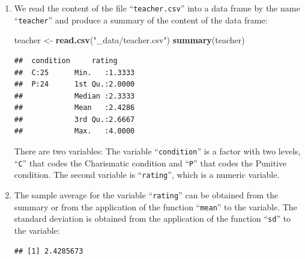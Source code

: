 \documentclass[]{krantz}
\makeatletter
\newenvironment{Shaded}{\begin{snugshade}}{\end{snugshade}}
\newcommand{\KeywordTok}[1]{\textcolor[rgb]{0.13,0.29,0.53}{\textbf{#1}}}
\newcommand{\StringTok}[1]{\textcolor[rgb]{0.31,0.60,0.02}{#1}}
\newcommand{\OperatorTok}[1]{\textcolor[rgb]{0.81,0.36,0.00}{\textbf{#1}}}
\newcommand{\NormalTok}[1]{#1}
\newenvironment{kframe}{%
\medskip{}
\setlength{\fboxsep}{.8em}
 \def\at@end@of@kframe{}%
 \ifinner\ifhmode%
  \def\at@end@of@kframe{\end{minipage}}%
  \begin{minipage}{\columnwidth}%
 \fi\fi%
 \def\FrameCommand##1{\hskip\@totalleftmargin \hskip-\fboxsep
 \colorbox{shadecolor}{##1}\hskip-\fboxsep
     \hskip-\linewidth \hskip-\@totalleftmargin \hskip\columnwidth}%
 \MakeFramed {\advance\hsize-\width
   \@totalleftmargin\z@ \linewidth\hsize
   \@setminipage}}%
 {\par\unskip\endMakeFramed%
 \at@end@of@kframe}
\renewenvironment{Shaded}{\begin{kframe}}{\end{kframe}}
\theoremstyle{definition}
\theoremstyle{definition}
\theoremstyle{definition}
\theoremstyle{remark}
\makeatother
\begin{document}
\begin{enumerate}
\def\labelenumi{\arabic{enumi}.}
\item
  We read the content of the file ``\texttt{teacher.csv}'' into a data
  frame by the name ``\texttt{teacher}'' and produce a summary of the
  content of the data frame:

\begin{Shaded}
\begin{Highlighting}[]
\NormalTok{teacher <-}\StringTok{ }\KeywordTok{read.csv}\NormalTok{(}\StringTok{"_data/teacher.csv"}\NormalTok{)}
\KeywordTok{summary}\NormalTok{(teacher)}
\end{Highlighting}
\end{Shaded}

\begin{verbatim}
##  condition     rating      
##  C:25      Min.   :1.3333  
##  P:24      1st Qu.:2.0000  
##            Median :2.3333  
##            Mean   :2.4286  
##            3rd Qu.:2.6667  
##            Max.   :4.0000
\end{verbatim}

  There are two variables: The variable ``\texttt{condition}'' is a
  factor with two levels, ``\texttt{C}'' that codes the Charismatic
  condition and ``\texttt{P}'' that codes the Punitive condition. The
  second variable is ``\texttt{rating}'', which is a numeric variable.
\item
  The sample average for the variable ``\texttt{rating}'' can be
  obtained from the summary or from the application of the function
  ``\texttt{mean}'' to the variable. The standard deviation is obtained
  from the application of the function ``\texttt{sd}'' to the variable:

\begin{Shaded}
\end{Shaded}

\begin{verbatim}
## [1] 2.4285673
\end{verbatim}

\begin{Shaded}
\end{Shaded}


\end{enumerate}
\end{document}
